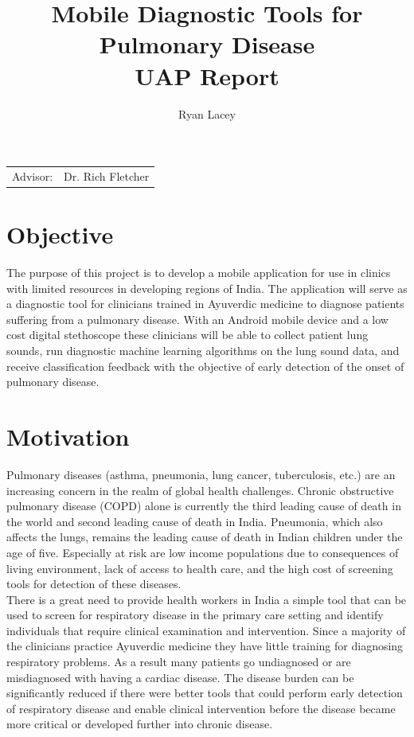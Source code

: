\documentclass{article}
\title{Mobile Diagnostic Tools for Pulmonary Disease\\ UAP Report} %
\author{Ryan Lacey}
\date{}
\begin{document}
\maketitle %

\begin{center}
\begin{tabular}{l r}
Advisor: & Dr. Rich Fletcher \\
\end{tabular}
\end{center}

\section{Objective}

The purpose of this project is to develop a mobile application for use in clinics with limited resources in developing regions of India. The application will serve as a diagnostic tool for clinicians trained in Ayuverdic medicine to diagnose patients suffering from a pulmonary disease. With an Android mobile device and a low cost digital stethoscope these clinicians will be able to collect patient lung sounds, run diagnostic machine learning algorithms on the lung sound data, and receive classification feedback with the objective of early detection of the onset of pulmonary disease.\\

\section{Motivation}

Pulmonary diseases (asthma, pneumonia, lung cancer, tuberculosis, etc.) are an increasing concern in the realm of global health challenges. Chronic obstructive pulmonary disease (COPD) alone is currently the third leading cause of death in the world and second leading cause of death in India. Pneumonia, which also affects the lungs, remains the leading cause of death in Indian children under the age of five. Especially at risk are low income populations due to consequences of living environment, lack of access to health care, and the high cost of screening tools for detection of these diseases.\\

There is a great need to provide health workers in India a simple tool that can be used to screen for respiratory disease in the primary care setting and identify individuals that require clinical examination and intervention. Since a majority of the clinicians practice Ayuverdic medicine they have little training for diagnosing respiratory problems. As a result many patients go undiagnosed or are misdiagnosed with having a cardiac disease. The disease burden can be significantly reduced if there were better tools that could perform early detection of respiratory disease and enable clinical intervention before the disease became more critical or developed further into chronic disease.\\
\end{document}
